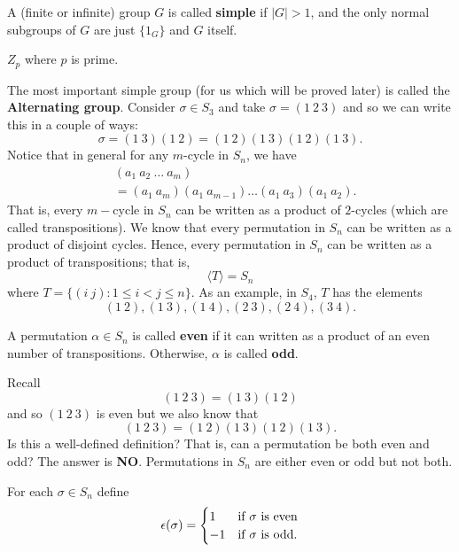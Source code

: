 \begin{definition}
   A (finite or infinite) group \( G  \) is called \textbf{simple} if \( | G  |  > 1  \), and the only normal subgroups of \( G  \) are just \( \{ {1}_{G} \}  \) and \( G  \) itself. 
\end{definition}

\begin{eg}
       \( Z_p \) where \( p  \) is prime.
\end{eg}
The most important simple group (for us which will be proved later) is called the \textbf{Alternating group}. Consider \( \sigma \in {S}_{3} \) and take \( \sigma = (1 \ 2 \ 3) \) and so we can write this in a couple of ways:
           \[  \sigma = (1 \ 3) (1 \ 2) = (1 \ 2)(1 \ 3)(1 \ 2)(1 \ 3). \]
           Notice that in general for any \( m  \)-cycle in \( {S}_{n} \), we have 
           \begin{align*} 
               &({a}_{1} \ {a}_{2} \ \dots \ {a}_{m}) \\
               &= ({a}_{1} \ {a}_{m}) ({a}_{1} \ {a}_{m-1}) \dots ({a}_{1} \ {a}_{3})({a}_{1} \ {a}_{2}).
           \end{align*}
           That is, every \( m-  \)cycle in \( {S}_{n} \) can be written as a product of \( 2 \)-cycles (which are called transpositions). We know that every permutation in \( {S}_{n} \) can be written as a product of disjoint cycles. Hence, every permutation in \( {S}_{n} \) can be written as a product of transpositions; that is, 
           \[  \langle T  \rangle = {S}_{n} \]
           where \( T = \{  (i \ j) : 1 \leq i < j \leq n  \}  \). As an example, in \( {S}_{4} \), \( T  \) has the elements 
           \[  (1 \ 2), (1 \ 3) ,(1 \ 4), (2 \ 3), (2 \ 4), (3 \ 4). \]

\begin{definition}
    A permutation \( \alpha \in {S}_{n} \) is called \textbf{even} if it can written as a product of an even number of transpositions. Otherwise, \( \alpha  \) is called \textbf{odd}. 
\end{definition}

Recall 
\[  (1 \ 2 \ 3 ) = (1 \ 3)(1 \ 2) \]
and so \( (1 \ 2 \ 3)  \) is even but we also know that 
\[  ( 1 \ 2 \ 3) = (1 \ 2)(1 \ 3)(1 \ 2)(1 \ 3). \]
Is this a well-defined definition? That is, can a permutation be both even and odd? The answer is \textbf{NO}. Permutations in \( {S}_{n} \) are either even or odd but not both. 

\begin{definition}[ ]
   For each \( \sigma \in {S}_{n} \) define 
   \[  \epsilon (\sigma)  = 
   \begin{cases}
       1 &\text{if \( \sigma  \) is even} \\ 
       -1 &\text{if \( \sigma \) is odd}.
   \end{cases} \]
\end{definition}

